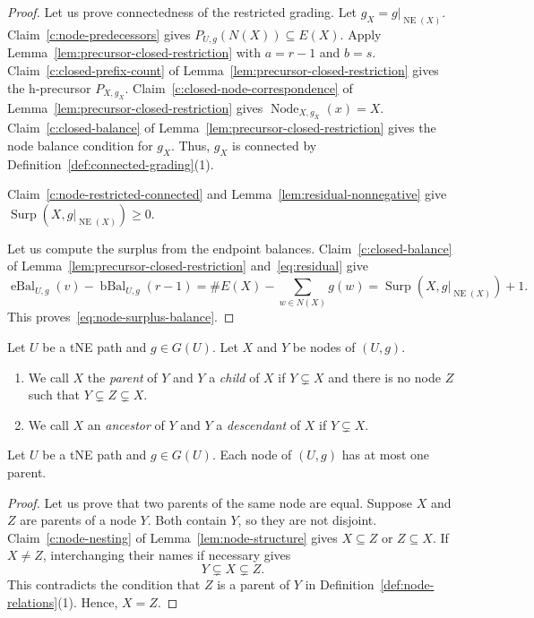\begin{proof}
 Let us prove connectedness of the restricted grading.
Let $g_X=g|_{\operatorname{NE}(X)}$.
Claim~\ref{c:node-predecessors} gives $P_{U,g}(N(X))\subseteq E(X)$.
Apply Lemma~\ref{lem:precursor-closed-restriction} with $a=r-1$ and $b=s$.
Claim~\ref{c:closed-prefix-count} of Lemma~\ref{lem:precursor-closed-restriction} gives the h-precursor $P_{X,g_X}$.
Claim~\ref{c:closed-node-correspondence} of Lemma~\ref{lem:precursor-closed-restriction} gives $\operatorname{Node}_{X,g_X}(x)=X$.
Claim~\ref{c:closed-balance} of Lemma~\ref{lem:precursor-closed-restriction} gives the node balance condition for $g_X$.
Thus, $g_X$ is connected by Definition~\ref{def:connected-grading}(1).

Claim~\ref{c:node-restricted-connected}
and Lemma~\ref{lem:residual-nonnegative} give
$\operatorname{Surp}(X,g|_{\operatorname{NE}(X)})\ge0$.

 Let us compute the surplus from the endpoint balances.
Claim~\ref{c:closed-balance} of
Lemma~\ref{lem:precursor-closed-restriction} and~\eqref{eq:residual} give
\[
 \operatorname{eBal}_{U,g}(v)-\operatorname{bBal}_{U,g}(r-1)
 =\#E(X)-\sum_{w\in N(X)}g(w)
 =\operatorname{Surp}(X,g|_{\operatorname{NE}(X)})+1.
\]
This proves~\eqref{eq:node-surplus-balance}.
\end{proof}

\begin{definition}\label{def:node-relations}
Let $U$ be a tNE path and $g\in G(U)$. Let $X$ and $Y$ be nodes of $(U,g)$.
\begin{enumerate}[font=\itshape]
\item We call $X$ the \textit{parent} of $Y$ and $Y$ a \textit{child} of $X$
if $Y\subsetneq X$
and there is no node $Z$ such that $Y\subsetneq Z\subsetneq X$.
\item We call $X$ an \textit{ancestor} of $Y$ and $Y$ a \textit{descendant} of $X$
if $Y\subsetneq X$.
\end{enumerate}
\end{definition}
\begin{lemma}\label{lem:parent-unique}
Let $U$ be a tNE path and $g\in G(U)$.
Each node of $(U,g)$ has at most one parent.
\end{lemma}
\begin{proof}
Let us prove that two parents of the same node are equal.
Suppose $X$ and $Z$ are parents of a node $Y$.
Both contain $Y$, so they are not disjoint.
Claim~\ref{c:node-nesting} of Lemma~\ref{lem:node-structure} gives $X\subseteq Z$ or $Z\subseteq X$.
If $X\ne Z$, interchanging their names if necessary gives
\[
 Y\subsetneq X\subsetneq Z.
\]
This contradicts the condition that $Z$ is a parent of $Y$ in Definition~\ref{def:node-relations}(1).
Hence, $X=Z$.
\end{proof}

